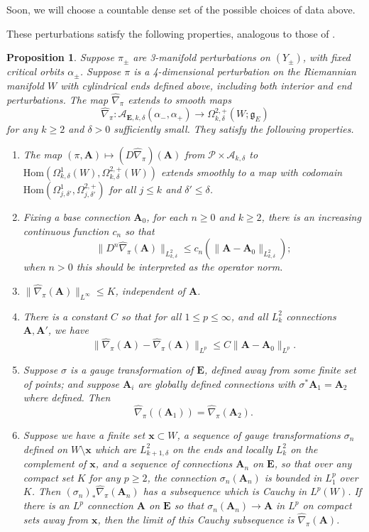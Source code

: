 \documentclass[10pt,a4paper]{amsart}
\newtheorem{proposition}[theorem]{Proposition}
\theoremstyle{definition}
\theoremstyle{remark}
\numberwithin{figure}{qchap}
\begin{document}
Soon, we will choose a countable dense set of the possible choices of data above.

These perturbations satisfy the following properties, analogous to those of \cite[Proposition~3.7]{KM1}.%

\begin{proposition}\label{pertfacts}Suppose $\pi_\pm$ are 3-manifold perturbations on $(Y_\pm)$, with fixed critical orbits $\alpha_\pm$. 
Suppose $\pi$ is a 4-dimensional perturbation on the Riemannian manifold $W$ with cylindrical ends defined above, including both interior and end perturbations. The map $\widehat{\nabla}_\pi$ extends to smooth maps $$\widehat{\nabla}_\pi: \mathcal A_{\mathbf{E},k,\delta}(\alpha_-, \alpha_+) \to \Omega^{2,+}_{k,\delta}(W;\mathfrak g_E)$$ for any $k \geq 2$ and $\delta > 0$ sufficiently small. They satisfy the following properties. 
\begin{enumerate}
\item The map $(\pi, \mathbf A) \mapsto (D\widehat{\nabla}_\pi)(\mathbf A)$ from $\mathcal P \times \mathcal A_{k,\delta}$ to $\text{Hom}\left(\Omega^1_{k,\delta}(W), \Omega^{2,+}_{k,\delta}(W)\right)$ extends smoothly to a map with codomain $\text{Hom}(\Omega^1_{j,\delta'}, \Omega^{2,+}_{j,\delta'})$ for all $j \le k$ and $\delta' \le \delta$.
\item Fixing a base connection $\mathbf{A}_0$, for each $n \geq 0$ and $k \geq 2$, there is an increasing continuous function $c_n$ so that $$\|D^n\widehat \nabla_\pi(\mathbf{A})\|_{L^2_{k,\delta}} \leq c_n\left(\|\mathbf{A}-\mathbf{A}_0\|_{L^2_{k,\delta}}\right);$$ when $n > 0$ this should be interpreted as the operator norm.
\item $\|\widehat{\nabla}_\pi(\mathbf{A})\|_{L^\infty} \leq K$, independent of $\mathbf{A}$. 
\item There is a constant $C$ so that for all $1 \leq p \leq \infty$, and all $L^2_k$ connections $\mathbf{A}, \mathbf{A}'$, we have 
$$\|\widehat{\nabla}_\pi(\mathbf{A}) - \widehat{\nabla}_\pi(\mathbf{A})\|_{L^p} \leq C\|\mathbf{A} - \mathbf{A}_0\|_{L^p}.$$
\item Suppose $\sigma$ is a gauge transformation of $\mathbf{E}$, defined away from some finite set of points; and suppose $\mathbf{A}_i$ are globally defined connections with $\sigma^*\mathbf{A}_1 = \mathbf{A}_2$ where defined. Then $$\widehat{\nabla}_\pi((\mathbf{A}_1)) = \widehat{\nabla}_\pi(\mathbf{A}_2).$$
\item Suppose we have a finite set $\mathbf{x} \subset W$, a sequence of gauge transformations $\sigma_n$ defined on $W \setminus \mathbf{x}$ which are $L^2_{k+1,\delta}$ on the ends and locally $L^2_k$ on the complement of $\mathbf{x}$, and a sequence of connections $\mathbf{A}_n$ on $\mathbf{E}$, so that over any compact set $K$ for any $p \geq 2$, the connection $\sigma_n(\mathbf{A}_n)$ is bounded in $L^p_1$ over $K$. Then $(\sigma_n)_* \widehat{\nabla}_\pi(\mathbf{A}_n)$ has a subsequence which is Cauchy in $L^p(W)$. If there is an $L^p$ connection $\mathbf{A}$ on $\mathbf{E}$ so that $\sigma_n(\mathbf{A}_n) \to \mathbf{A}$ in $L^p$ on compact sets away from $\mathbf{x}$, then the limit of this Cauchy subsequence is $\widehat{\nabla}_\pi(\mathbf{A})$.

\end{enumerate}
\end{proposition}
\end{document}
